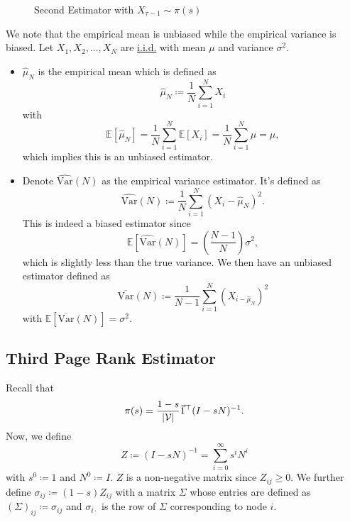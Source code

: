 \begin{figure}[H]
	\centering
	\caption{Second Estimator with \(X_{\tau-1}\sim\pi(s)\)}
	\label{fig:Monte-Carlo-Estimator-2}
\end{figure}

\begin{note}
	We note that the empirical mean is unbiased while the empirical variance is biased. Let \(X_1, X_2, \ldots  ,X_N\) are \hyperref[def:i.i.d.]{i.i.d.} with mean \(\mu\) and variance \(\sigma^2\).
	\begin{itemize}
		\item\(\hat{\mu}_N\) is the empirical mean which is defined as
		\[
			\hat{\mu}_N \coloneqq  \frac{1}{N}\sum\limits_{i=1}^{N} X_i
		\]
		with
		\[
			\mathbb{E}\left[\hat{\mu}_N \right] = \frac{1}{N}\sum\limits_{i=1}^{N} \mathbb{E}\left[X_i \right] = \frac{1}{N}\sum\limits_{i=1}^{N} \mu = \mu,
		\]
		which implies this is an unbiased estimator.
		\item Denote \(\hat{\mathrm{Var}}(N)\) as the empirical variance estimator. It's defined as
		      \[
			      \hat{\mathrm{Var}}(N) \coloneqq \frac{1}{N}\sum\limits_{i=1}^{N} (X_i - \hat{\mu}_N)^2.
		      \]
		      This is indeed a biased estimator since
		      \[
			      \mathbb{E}\left[\hat{\mathrm{Var}}(N) \right]  = \left(\frac{N-1}{N}\right) \sigma^2,
		      \]
		      which is slightly less than the true variance. We then have an unbiased estimator defined as
		      \[
			      \overline{\mathrm{Var}}(N) \coloneqq  \frac{1}{N-1}\sum\limits_{i=1}^{N} (X_{i-\hat{\mu}_N})^2
		      \]
		      with \(\mathbb{E}\left[\overline{\mathrm{Var}}(N) \right]  = \sigma^2\).
	\end{itemize}
\end{note}

\subsection{Third Page Rank Estimator}\label{subsec:third-page-rank-estimator}
Recall that
\[
	\pi(s) = \frac{1 - s}{\left\vert \mathcal{\MakeUppercase{v}}  \right\vert}\vec{1}^{\top} (I - sN)^{-1}.
\]
Now, we define
\[
	Z \coloneqq (I - sN)^{-1} = \sum\limits_{i=0}^{\infty} s^i N^i
\]
with \(s^0\coloneqq 1\) and \(N^0\coloneqq I\). \(Z\) is a non-negative matrix since \(Z_{ij}\geq 0\). We further define \(\sigma_{ij}\coloneqq (1 - s)Z_{ij}\) with a matrix \(\Sigma \) whose entries are defined as \(\left(\Sigma\right)_{ij}\coloneqq \sigma_{ij}\) and \(\sigma_{i\cdot}\) is the row of \(\Sigma\) corresponding to node \(i\).


